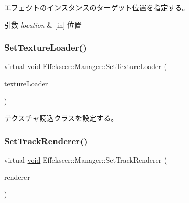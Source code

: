 エフェクトのインスタンスのターゲット位置を指定する。 


\begin{DoxyParams}{引数}
{\em location} & \mbox{[}in\mbox{]} 位置 \\
\hline
\end{DoxyParams}
\mbox{\label{class_effekseer_1_1_manager_a35915c6406f06e7502abed5eeba6ee51}} 
\subsubsection{\texorpdfstring{Set\+Texture\+Loader()}{SetTextureLoader()}}
{\footnotesize\ttfamily virtual \mbox{\hyperlink{namespace_effekseer_ab34c4088e512200cf4c2716f168deb56}{void}} Effekseer\+::\+Manager\+::\+Set\+Texture\+Loader (\begin{DoxyParamCaption}\item[{\mbox{\hyperlink{class_effekseer_1_1_texture_loader}{Texture\+Loader}} $\ast$}]{texture\+Loader }\end{DoxyParamCaption})\hspace{0.3cm}{\ttfamily [pure virtual]}}



テクスチャ読込クラスを設定する。 

\mbox{\label{class_effekseer_1_1_manager_a7bff3a7ec23d6ae4a66b6f6ba4bd58fc}} 
\subsubsection{\texorpdfstring{Set\+Track\+Renderer()}{SetTrackRenderer()}}
{\footnotesize\ttfamily virtual \mbox{\hyperlink{namespace_effekseer_ab34c4088e512200cf4c2716f168deb56}{void}} Effekseer\+::\+Manager\+::\+Set\+Track\+Renderer (\begin{DoxyParamCaption}\item[{\mbox{\hyperlink{class_effekseer_1_1_track_renderer}{Track\+Renderer}} $\ast$}]{renderer }\end{DoxyParamCaption})\hspace{0.3cm}{\ttfamily [pure virtual]}}



